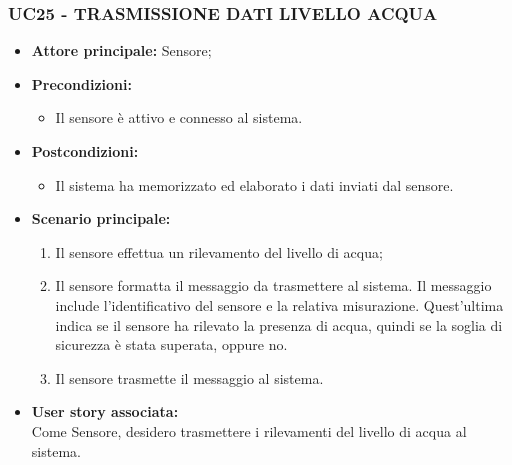 \subsubsection{UC25 - TRASMISSIONE DATI LIVELLO ACQUA}
\begin{itemize}
    \item \textbf{Attore principale:} Sensore;
    \item \textbf{Precondizioni:}
        \begin{itemize}
            \item Il sensore è attivo e connesso al sistema. 
        \end{itemize}
    \item \textbf{Postcondizioni:}
        \begin{itemize}
            \item Il sistema ha memorizzato ed elaborato i dati inviati dal sensore.
        \end{itemize}
    \item \textbf{Scenario principale:}
        \begin{enumerate}
            \item Il sensore effettua un rilevamento del livello di acqua;
            \item Il sensore formatta il messaggio da trasmettere al sistema. Il messaggio include l'identificativo del sensore e la relativa misurazione. Quest'ultima indica se il sensore ha rilevato la presenza di acqua, quindi se la soglia di sicurezza è stata superata, oppure no.
            \item Il sensore trasmette il messaggio al sistema.
        \end{enumerate}
    \item \textbf{User story associata:} \\
    Come Sensore, desidero trasmettere i rilevamenti del livello di acqua al sistema.
\end{itemize}
